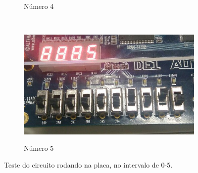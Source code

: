 \begin{figure}[H]
\begin{subfigure}[b]{0.44\textwidth}
				\label{fig:etapa1-4}
				\caption{Número 4}
			\end{subfigure}
			~
			\begin{subfigure}[b]{0.44\textwidth}
				\includegraphics[width=\textwidth]{img/etapa1/5}
				\label{fig:etapa1-5}
				\caption{Número 5}
			\end{subfigure}

			\caption{Teste do circuito rodando na placa, no intervalo de 0-5.}\label{fig:etapa1Teste1}
		\end{figure}

